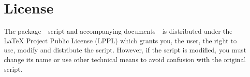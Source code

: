 \documentclass{article}
\begin{document}

\section{License}

The \TeXcount{} package---script and accompanying documents---is distributed
under the \LaTeX{} Project Public License (LPPL)
which grants you, the user, the right to use, modify and distribute
the script. However, if the script is modified, you must change its
name or use other technical means to avoid confusion with the original script.
\end{document}
